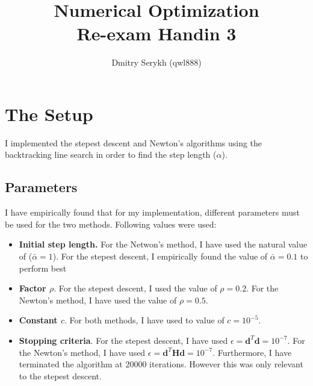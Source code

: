 \documentclass[a4paper]{article}
\title{\vspace{-5cm} Numerical Optimization \\ Re-exam Handin 3}
\author{Dmitry Serykh (qwl888)}
\newcommand{\bt}[1]{\mathbf{#1}}
\begin{document}
\maketitle
\section{The Setup}
I implemented the stepest descent and Newton's algorithms using the
backtracking line search in order to find the step length ($\alpha$).
\subsection{Parameters}
I have empirically found that for my implementation, different parameters must
be used for the two methods. Following values were used:
\begin{itemize}
\item \textbf{Initial step length.} For the Netwon's method, I have used the natural
  value of ($\bar{\alpha}=1$). For the stepest descent, I empirically found the value
  of $\bar{\alpha} = 0.1$  to perform best
\item \textbf{Factor $\rho$}. For the stepest descent, I used the value of
  $\rho = 0.2$. For the Newton's method, I have used the value of $\rho=0.5$.
\item \textbf{Constant $c$}. For both methods, I have used to value of $c=10^{-5}$.
\item \textbf{Stopping criteria}. For the stepest descent, I have used
  $\epsilon=\bt{d}^T\bt{d} = 10^{-7}$. For the Newton's method, I have used
  $\epsilon=\bt{d}^T\bt{Hd} = 10^{-7}$. Furthermore, I have terminated the
  algorithm at 20000 iterations. However this was only relevant to the stepest descent.
\end{itemize}
\end{document}
